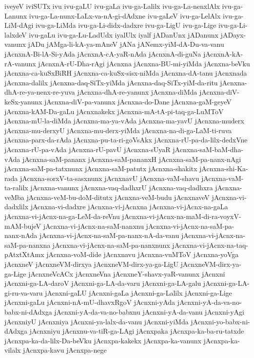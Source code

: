 {iveyeV
iviSUTx
ivu
ivu-gaLU
ivu-gaLa
ivu-ga-Lalilx
ivu-ga-La-nenxlAlx
ivu-ga-Lanunx
ivu-ga-La-nunx-LaLx-va-nA-gi-dAdxne
ivu-gaLeV
ivu-ga-LelAlx
ivu-ga-LiM-dAgi
ivu-ga-LiMda
ivu-ga-Li-didx-dadxre
ivu-ga-LigU
ivu-ga-Lige
ivu-ga-Li-lalxdeV
ivu-gaLu
ivu-ga-Lu-LadUdx
iyalUlx
iyalf
jADanUnx
jADanunx
jADayx-vanunx
jADu
jAMga-li-kA-ya-mAneV
jANa
jANemx-yiM-dA-Du-va-vanu
jAcnxnA-Bi-lA-Si-yAda
jAcnxnA-cA-yaR-nAda
jAcnxnA-di-guNa
jAcnxnA-kA-rA-vanunx
jAcnxnA-rU-Dha-rAgi
jAcnxna
jAcnxna-BU-mi-yiMda
jAcnxna-beVku
jAcnxna-ca-kuSxBiRH
jAcnxna-ca-kuSx-sisx-niMda
jAcnxna-dA-tanu
jAcnxnada
jAcnxna-dalilx
jAcnxna-daq-SiTx-yiMda
jAcnxna-daq-SiTx-yiM-da-ritu
jAcnxna-dhA-re-ya-nenx-re-yuva
jAcnxna-dhA-re-yanunx
jAcnxna-diMda
jAcnxna-diV-keSx-yanunx
jAcnxna-diV-pa-vanunx
jAcnxna-do-Dane
jAcnxna-gaM-geyeV
jAcnxna-kAM-Da-gaLu
jAcnxnakekx
jAcnxna-mA-tA-pi-taq-ga-LuMToV
jAcnxna-mU-la-diMda
jAcnxna-ma-ya-vAda
jAcnxna-ma-yavU
jAcnxna-muderx
jAcnxna-mu-derxyU
jAcnxna-mu-derx-yiMda
jAcnxna-na-di-ga-LaM-ti-ruva
jAcnxna-parx-da-rAda
jAcnxna-pu-ta-ri-goVsAkx
jAcnxna-rU-pa-da-lilx-dedxVne
jAcnxna-rU-pa-vAda
jAcnxna-rU-pavU
jAcnxna-sUyaR
jAcnxna-saM-baM-dha-vAda
jAcnxna-saM-pananx
jAcnxna-saM-pananxH
jAcnxna-saM-pa-nanx-nAgi
jAcnxna-saM-pa-tatxnunx
jAcnxna-saM-patutx
jAcnxna-shakitx
jAcnxna-shi-Ka-rada
jAcnxna-sorxV-ta-sasxnunx
jAcnxnavU
jAcnxna-vaM-shavu
jAcnxna-vaM-ta-ralilx
jAcnxna-vanunx
jAcnxna-vaq-dadhxrU
jAcnxna-vaq-dadhxra
jAcnxna-veMba
jAcnxna-veM-bu-doM-ditutx
jAcnxna-veM-budu
jAcnxnaveV
jAcnxna-vi-dadxlilx
jAcnxna-vi-dadxre
jAcnxna-vi-jAcnxna
jAcnxna-vi-jAcnx-na-gaLa
jAcnxna-vi-jAcnx-na-ga-LeM-da-reVnu
jAcnxna-vi-jAcnx-na-maM-di-ra-voyxV-mAM-bujeV
jAcnxna-vi-jAcnx-na-saM-nanxnu
jAcnxna-vi-jAcnx-na-saM-pa-nanx-nAda
jAcnxna-vi-jAcnx-na-saM-pa-nanx-nA-da-vanu
jAcnxna-vi-jAcnx-na-saM-pa-nanxna
jAcnxna-vi-jAcnx-na-saM-pa-nanxnunx
jAcnxna-vi-jAcnx-na-taq-pAtxtXtAmx
jAcnxna-voM-dide
jAcnxnavu
jAcnxna-vuMToV
jAcnxna-yoVga
jAcnxneV
jAcnxneVM-dirxya
jAcnxneVM-dirx-ya-ga-LigU
jAcnxneVM-dirx-ya-ga-Lige
jAcnxneVcACx
jAcnxneVna
jAcnxneY-shavx-yaR-vanunx
jAcnxni
jAcnxni-ga-LA-daroV
jAcnxni-ga-LA-da-varu
jAcnxni-ga-LA-galu
jAcnxni-ga-LA-gi-ru-va-varu
jAcnxni-gaLU
jAcnxni-gaLa
jAcnxni-ga-Lalilx
jAcnxni-ga-Lige
jAcnxni-gaLu
jAcnxni-nA-mU-dhavxRgoV
jAcnxni-yAda
jAcnxni-yA-da-va-no-babx-ni-dAdxga
jAcnxni-yA-da-va-no-babxnu
jAcnxni-yA-da-vanu
jAcnxni-yAgi
jAcnxniyU
jAcnxniya
jAcnxni-ya-lalx-da-vanu
jAcnxni-yiMda
jAcnxni-yo-babx-ni-dAdxga
jAcnxniyu
jAcnxnu-va-tiR-ga-LAgi
jAcnxpaka
jAcnxpa-ka-ba-ru-tatxde
jAcnxpa-ka-da-lilx-Da-beVku
jAcnxpa-kakekx
jAcnxpa-ka-vanunx
jAcnxpa-ka-vilalx
jAcnxpa-kavu
jAcnxpa-nege
}
